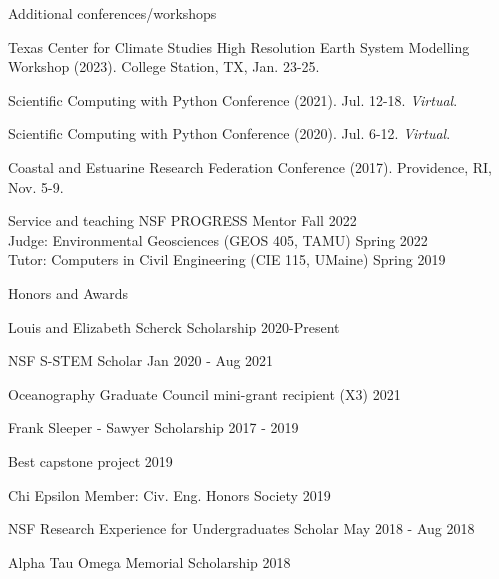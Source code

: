 \documentclass{resume} %
\begin{document}
\begin{rSection}{Additional conferences/workshops} \itemsep -3pt
\begin{etaremune}
    \item Texas Center for Climate Studies High Resolution Earth System Modelling Workshop (2023). College Station, TX, Jan. 23-25. 
    \item Scientific Computing with Python Conference (2021). Jul. 12-18. \textit{Virtual}. 
    \item Scientific Computing with Python Conference (2020). Jul. 6-12.  \textit{Virtual}.
    \item Coastal and Estuarine Research Federation Conference (2017). Providence, RI, Nov. 5-9.
\end{etaremune}
\end{rSection}

\begin{rSection}{Service and teaching}
NSF PROGRESS Mentor \hfill Fall 2022 \\
Judge: Environmental Geosciences (GEOS 405, TAMU) \hfill Spring 2022 \\
Tutor: Computers in Civil Engineering (CIE 115, UMaine) \hfill Spring 2019 \\
\end{rSection}
\vspace{-10pt}
\begin{rSection}{Honors and Awards} \itemsep -3pt {}
\vspace{-7pt}
\item Louis and Elizabeth Scherck Scholarship \hfill 2020-Present
\item NSF S-STEM Scholar \hfill Jan 2020 - Aug 2021 
\item Oceanography Graduate Council mini-grant recipient (X3) \hfill 2021
\item Frank Sleeper - Sawyer Scholarship \hfill 2017 - 2019
\item Best capstone project \hfill 2019
\item Chi Epsilon Member: Civ. Eng. Honors Society \hfill 2019 
\item NSF Research Experience for Undergraduates Scholar \hfill May 2018 - Aug 2018
\item Alpha Tau Omega Memorial Scholarship \hfill 2018
\end{rSection}
\end{document}
